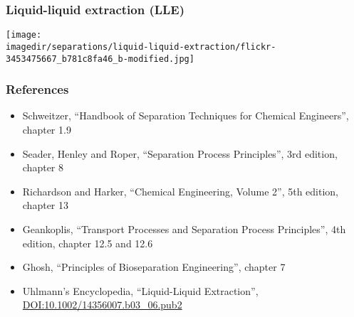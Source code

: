 




\begin{frame}\frametitle{Liquid-liquid extraction (LLE)}
	\begin{center}
		\texttt{[image: \\imagedir/separations/liquid-liquid-extraction/flickr-3453475667\_b781c8fa46\_b-modified.jpg]}
	\end{center}
	\vspace{-12pt}
\end{frame}

\begin{frame}\frametitle{References}
	\begin{itemize}
		\item	Schweitzer, ``Handbook of Separation Techniques for Chemical Engineers'', chapter 1.9
		\item	Seader, Henley and Roper, ``Separation Process Principles'', 3rd edition, chapter 8
		\item	Richardson and Harker, ``Chemical Engineering, Volume 2'', 5th edition, chapter 13
		\item	Geankoplis, ``Transport Processes and Separation Process Principles'', 4th edition, chapter 12.5 and 12.6
		\item	Ghosh, ``Principles of Bioseparation Engineering'', chapter 7
		\item	Uhlmann's Encyclopedia, ``Liquid-Liquid Extraction'',  \href{http://dx.doi.org/10.1002/14356007.b03\_06.pub2}{DOI:10.1002/14356007.b03\_06.pub2}
	\end{itemize}
\end{frame}

